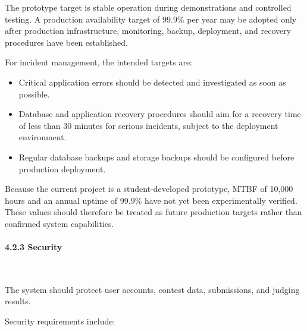 The prototype target is stable operation during demonstrations and controlled testing. A production availability target of 99.9\% per year may be adopted only after production infrastructure, monitoring, backup, deployment, and recovery procedures have been established.

For incident management, the intended targets are:

\begin{itemize}[leftmargin=1.5em, nosep]
    \item Critical application errors should be detected and investigated as soon as possible.
    \item Database and application recovery procedures should aim for a recovery time of less than 30 minutes for serious incidents, subject to the deployment environment.
    \item Regular database backups and storage backups should be configured before production deployment.
\end{itemize}

Because the current project is a student-developed prototype, MTBF of 10,000 hours and an annual uptime of 99.9\% have not yet been experimentally verified. These values should therefore be treated as future production targets rather than confirmed system capabilities.

\paragraph*{4.2.3 Security}\leavevmode\\[-0.5em]
\label{par:security}

The system should protect user accounts, contest data, submissions, and judging results.

Security requirements include:

